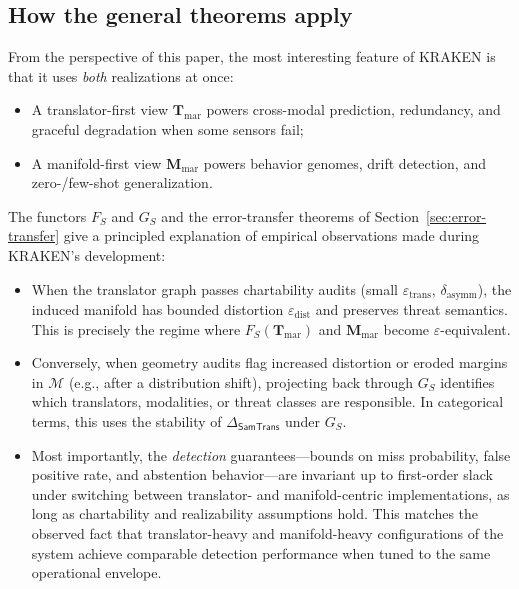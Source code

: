 \documentclass[11pt]{article}
\newcommand{\SamTrans}{\mathsf{SamTrans}}
\begin{document}
\subsection{How the general theorems apply}

From the perspective of this paper, the most interesting feature of KRAKEN is
that it uses \emph{both} realizations at once:
\begin{itemize}
  \item A translator-first view $\mathbf{T}_{\mathrm{mar}}$ powers cross-modal
        prediction, redundancy, and graceful degradation when some sensors fail;
  \item A manifold-first view $\mathbf{M}_{\mathrm{mar}}$ powers behavior
        genomes, drift detection, and zero-/few-shot generalization.
\end{itemize}

The functors $F_S$ and $G_S$ and the error-transfer theorems of
Section~\ref{sec:error-transfer} give a principled explanation of empirical
observations made during KRAKEN’s development:

\begin{itemize}
  \item When the translator graph passes chartability audits (small
        $\varepsilon_{\mathrm{trans}}$, $\delta_{\mathrm{asymm}}$), the induced
        manifold has bounded distortion $\varepsilon_{\mathrm{dist}}$ and
        preserves threat semantics. This is precisely the regime where
        $F_S(\mathbf{T}_{\mathrm{mar}})$ and $\mathbf{M}_{\mathrm{mar}}$ become
        $\varepsilon$-equivalent.

  \item Conversely, when geometry audits flag increased distortion or eroded
        margins in $\mathcal{M}$ (e.g., after a distribution shift), projecting
        back through $G_S$ identifies which translators, modalities, or threat
        classes are responsible. In categorical terms, this uses the stability
        of $\Delta_{\SamTrans}$ under $G_S$.

  \item Most importantly, the \emph{detection} guarantees---bounds on
        miss probability, false positive rate, and abstention behavior---are
        invariant up to first-order slack under switching between translator-
        and manifold-centric implementations, as long as chartability and
        realizability assumptions hold. This matches the observed fact that
        translator-heavy and manifold-heavy configurations of the system achieve
        comparable detection performance when tuned to the same operational
        envelope.
\end{itemize}
\end{document}
